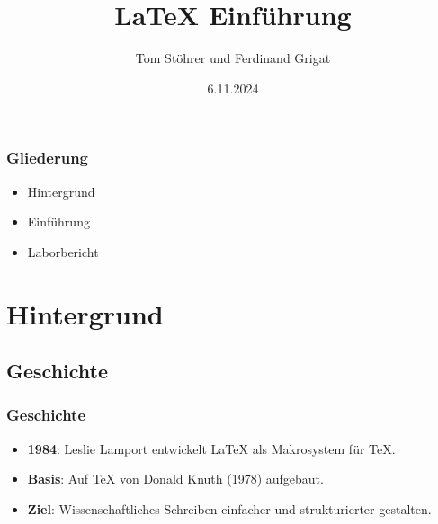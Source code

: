 \documentclass[aspectratio=169]{beamer}
\title{LaTeX Einführung}
\author{Tom Stöhrer und Ferdinand Grigat}
\date{6.11.2024}
\begin{document}


\begin{frame}
  
\thispagestyle{empty}
\end{frame}






\frame{\titlepage}

\begin{frame}
\frametitle{Gliederung}

\begin{itemize}
  \item Hintergrund
  \item Einführung
  \item Laborbericht
\end{itemize}


\end{frame}



\section{Hintergrund}

\subsection{Geschichte}
\begin{frame}
\frametitle{Geschichte}

\begin{itemize}
\item \textbf{1984}: Leslie Lamport entwickelt LaTeX als Makrosystem für TeX.
\item \textbf{Basis}: Auf TeX von Donald Knuth (1978) aufgebaut.
\item \textbf{Ziel}: Wissenschaftliches Schreiben einfacher und strukturierter gestalten.
\end{itemize}

\end{frame}
\end{document}
